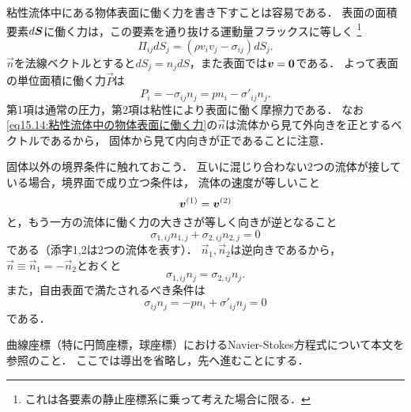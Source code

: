 粘性流体中にある物体表面に働く力を書き下すことは容易である．
表面の面積要素$d\vb*{S}$に働く力は，この要素を通り抜ける運動量フラックスに等しく
\footnote{これは各要素の静止座標系に乗って考えた場合に限る．}
\[
    \varPi_{ij}dS_j = (\rho v_iv_j - \sigma_{ij}) dS_j .
\]
$\vec{n}$を法線ベクトルとすると$dS_j=n_j dS$，また表面では$\vb*{v}=\vb*{0}$である．
よって表面の単位面積に働く力$\vec{P}$は
\begin{equation}\label{eq15.14:粘性流体中の物体表面に働く力}
    P_i = -\sigma_{ij} n_j = p n_i - \sigma'_{ij} n_j .
\end{equation}
第1項は通常の圧力，第2項は粘性により表面に働く摩擦力である．
なお\eqref{eq15.14:粘性流体中の物体表面に働く力}の$\vec{n}$は流体から見て外向きを正とするベクトルであるから，
固体から見て内向きが正であることに注意．



固体以外の境界条件に触れておこう．
互いに混じり合わない2つの流体が接している場合，境界面で成り立つ条件は，
流体の速度が等しいこと
\[
    \vb*{v}^{(1)} = \vb*{v}^{(2)}
\]
と，もう一方の流体に働く力の大きさが等しく向きが逆となること
\[
    \sigma_{1,ij}n_{1,j} + \sigma_{2,ij}n_{2,j} = 0
\]
である（添字1,2は2つの流体を表す）．
$\vec{n}_1,\vec{n}_2$は逆向きであるから，$\vec{n}\equiv\vec{n}_1=-\vec{n}_2$とおくと
\begin{equation}
    \sigma_{1,ij}n_j = \sigma_{2,ij}n_j .
\end{equation}
また，自由表面で満たされるべき条件は
\begin{equation}\label{eq15.16:粘性流体の境界条件（自由表面）}
    \sigma_{ij}n_j = -p n_i + \sigma'_{ij} n_j = 0
\end{equation}
である．


\begin{details}
曲線座標（特に円筒座標，球座標）におけるNavier-Stokes方程式について本文を参照のこと．
ここでは導出を省略し，先へ進むことにする．
\end{details}




\BackToTheToc